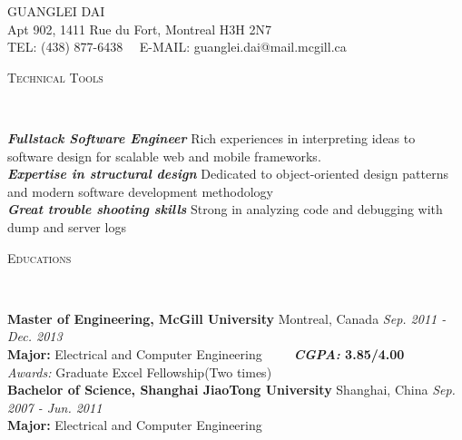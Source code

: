 \documentclass[11pt]{article}
\newenvironment{changemargin}[2]{%
  \begin{list}{}{%
    \setlength{\topsep}{0pt}%
    \setlength{\leftmargin}{#1}%
    \setlength{\rightmargin}{#2}%
    \setlength{\listparindent}{\parindent}%
    \setlength{\itemindent}{\parindent}%
    \setlength{\parsep}{\parskip}%
  }%
  \item[]}{\end{list}
}
\newcommand{\lineover}{
	\begin{changemargin}{-0.05in}{-0.05in}
		\vspace*{-8pt}
		\hrulefill \\
		\vspace*{-2pt}
	\end{changemargin}
}
\newcommand{\header}[1]{
	\begin{changemargin}{-0.5in}{-0.5in}
		\scshape{#1}\\
  	\lineover
	\end{changemargin}
}
\newcommand{\contact}[4]{
	\begin{changemargin}{-0.5in}{-0.5in}
		\begin{center}
			{\Large \scshape {#1}}\\ \smallskip
			{#2}\\ \smallskip
			{#3}\\ \smallskip
			{#4}\smallskip
		\end{center}
	\end{changemargin}
}
\newenvironment{body} {
	\vspace*{-16pt}
	\begin{changemargin}{-0.25in}{-0.5in}
  }	
	{\end{changemargin}
}
\begin{document}
\small
\contact{GUANGLEI DAI}{Apt 902, 1411 Rue du Fort,
Montreal H3H 2N7}{TEL: (438) 877-6438~~ E-MAIL: guanglei.dai@mail.mcgill.ca}
\smallskip
\header{Technical Tools}
\begin{body}
	\vspace{14pt}
	\emph{\textbf{Fullstack Software Engineer}}{} {Rich experiences in interpreting ideas to software design for scalable web and mobile frameworks.} \\
	\medskip
	\emph{\textbf{Expertise in structural design}}{} {Dedicated to object-oriented design patterns and modern software development methodology} \\
	\medskip
	\emph{\textbf{Great trouble shooting skills}}{} {Strong in analyzing code and debugging with dump and server logs} \\
\end{body}
\smallskip

\header{Educations}
\begin{body}
	\vspace{14pt}
	\textbf{Master of Engineering, McGill University} {Montreal, Canada}   \hfill \emph{Sep. 2011 - Dec. 2013}{}  \\
	\textbf{Major:} Electrical and Computer Engineering~~~~~\textbf{\emph{CGPA:} 3.85/4.00} \\
	\emph{Awards:} Graduate Excel Fellowship(Two times)\\

  \medskip	  
	\textbf{Bachelor of Science, Shanghai JiaoTong University} {Shanghai, China}   \hfill \emph{Sep. 2007 - Jun. 2011} \\
	\textbf{Major:} Electrical and Computer Engineering ~~~~~ \\
\end{body}
\smallskip
\end{document}
